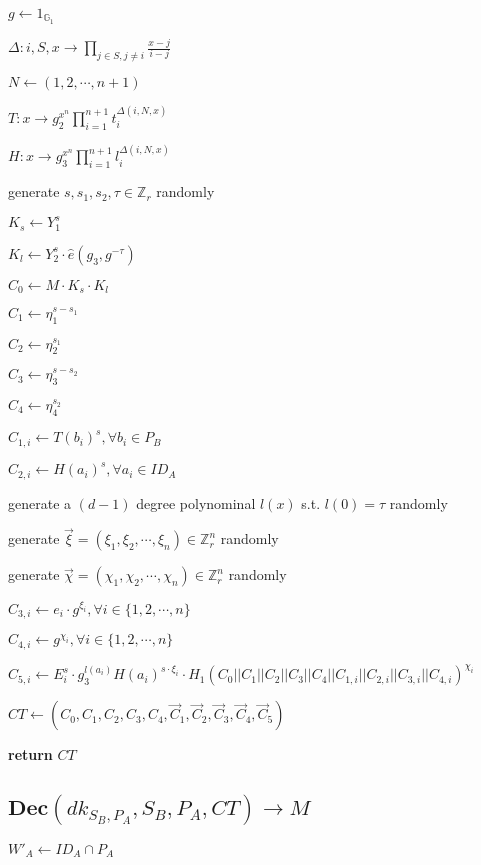 \documentclass[a4paper]{article}
\begin{document}
$g \gets 1_{\mathbb{G}_1}$

$\Delta: i, S, x \rightarrow \prod\limits_{j \in S, j \neq i} \frac{x - j}{i - j}$

$N \gets (1, 2, \cdots, n + 1)$

$T: x \rightarrow g_2^{x^n} \prod\limits_{i = 1}^{n + 1} t_i^{\Delta(i, N, x)}$

$H: x \rightarrow g_3^{x^n} \prod\limits_{i = 1}^{n + 1} l_i^{\Delta(i, N, x)}$

generate $s, s_1, s_2, \tau \in \mathbb{Z}_r$ randomly

$K_s \gets Y_1^s$

$K_l \gets Y_2^s \cdot \hat{e}(g_3, g^{-\tau})$

$C_0 \gets M \cdot K_s \cdot K_l$

$C_1 \gets \eta_1^{s - s_1}$

$C_2 \gets \eta_2^{s_1}$

$C_3 \gets \eta_3^{s - s_2}$

$C_4 \gets \eta_4^{s_2}$

$C_{1, i} \gets T(b_i)^s, \forall b_i \in P_B$

$C_{2, i} \gets H(a_i)^s, \forall a_i \in ID_A$

generate a $(d - 1)$ degree polynominal $l(x)$ s.t. $l(0) = \tau$ randomly

generate $\vec{\xi} = (\xi_1, \xi_2, \cdots, \xi_n) \in \mathbb{Z}_r^n$ randomly

generate $\vec{\chi} = (\chi_1, \chi_2, \cdots, \chi_n) \in \mathbb{Z}_r^n$ randomly

$C_{3, i} \gets e_i \cdot g^{\xi_i}, \forall i \in \{1, 2, \cdots, n\}$

$C_{4, i} \gets g^{\chi_i}, \forall i \in \{1, 2, \cdots, n\}$

$C_{5, i} \gets E_i^s \cdot g_3^{l(a_i)} H(a_i)^{s \cdot \xi_i} \cdot H_1(C_0 || C_1 || C_2 || C_3 || C_4 || C_{1, i} || C_{2, i} || C_{3, i} || C_{4, i})^{\chi_i}$

$\textit{CT} \gets (C_0, C_1, C_2, C_3, C_4, \vec{C}_1, \vec{C}_2, \vec{C}_3, \vec{C}_4, \vec{C}_5)$

\textbf{return} $\textit{CT}$

\subsection{$\textbf{Dec}(\textit{dk}_{S_B, P_A}, S_B, P_A, \textit{CT}) \rightarrow M$}

$W'_A \gets ID_A \cap P_A$
\end{document}
